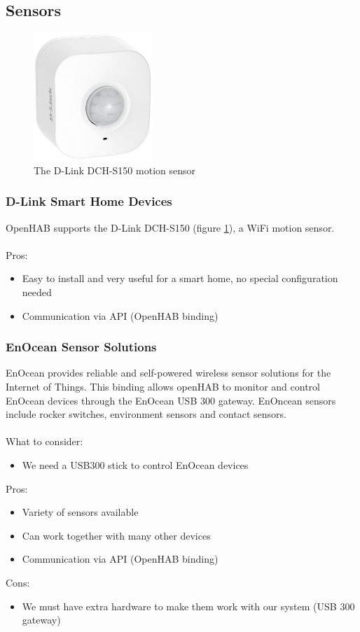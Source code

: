 \subsection{Sensors}

\begin{figure}
	\centering
	\includegraphics[width=0.4\textwidth]{images/Chapter_05/d-link-motion-sensor.jpg}
	\caption{The D-Link DCH-S150 motion sensor}
	\label{fig:d-link-motion-sensor}
\end{figure}

\subsubsection{D-Link Smart Home Devices}
OpenHAB supports the D-Link DCH-S150 (figure \ref{fig:d-link-motion-sensor}), a WiFi motion sensor.\\~\\
Pros:
\begin{itemize}
	\item Easy to install and very useful for a smart home, no special configuration needed
	\item Communication via API (OpenHAB binding)
\end{itemize}

\subsubsection{EnOcean Sensor Solutions}
EnOcean provides reliable and self-powered wireless sensor solutions for the Internet of Things. This binding allows openHAB
to monitor and control EnOcean devices through the EnOcean USB 300 gateway. EnOncean sensors include rocker switches,
environment sensors and contact sensors.\\~\\
What to consider:
\begin{itemize}
	\item We need a USB300 stick to control EnOcean devices
\end{itemize}
Pros:
\begin{itemize}
	\item Variety of sensors available
	\item Can work together with many other devices
	\item Communication via API (OpenHAB binding)
\end{itemize}
Cons:
\begin{itemize}
	\item We must have extra hardware to make them work with our system (USB 300 gateway)
\end{itemize}

